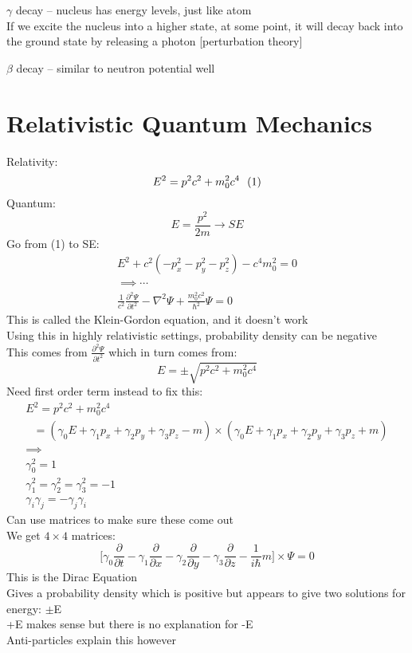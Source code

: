 \documentclass[a4paper, 11pt, fleqn, normalem]{report}
\begin{document}
$\gamma$ decay -- nucleus has energy levels, just like atom \\
If we excite the nucleus into a higher state, at some point, it will decay back into the ground state by releasing a photon [perturbation theory]

$\beta$ decay -- similar to neutron potential well

\section{Relativistic Quantum Mechanics}
Relativity:
\begin{equation*}
    E^{2} = p^{2}c^{2} + m_{0}^{2}c^{4} ~~ (1) \\
\end{equation*}
Quantum:
\begin{equation*}
    E = \frac{p^{2}}{2m} \rightarrow SE
\end{equation*}
Go from (1) to SE:
\begin{gather*}
    E^{2} + c^{2}(-p_{x}^{2} - p_{y}^{2} - p_{z}^{2}) - c^{4}m_{0}^{2} = 0 \\
    \implies \cdots \\
    \frac{1}{c^{2}}\frac{\partial^{2}\Psi}{\partial t^{2}} - \nabla^{2}\Psi + \frac{m_{0}^{2}c^{2}}{\hbar^{2}}\Psi = 0
\end{gather*}
This is called the Klein-Gordon equation, and it doesn't work \\
Using this in highly relativistic settings, probability density can be negative \\
This comes from $\frac{\partial^{2}\Psi}{\partial t^{2}}$ which in turn comes from:
\begin{equation*}
    E = \pm\sqrt{p^{2}c^{2} + m_{0}^{2}c^{4}}
\end{equation*}
Need first order term instead to fix this:
\begin{gather*}
    E^{2} = p^{2}c^{2} + m_{0}^{2}c^{4} \\
    ~~~ = (\gamma_{0}E + \gamma_{1}p_{x} + \gamma_{2}p_{y} + \gamma_{3}p_{z} - m) \times (\gamma_{0}E + \gamma_{1}p_{x} + \gamma_{2}p_{y} + \gamma_{3}p_{z} + m) \\
    \implies \\
    \gamma_{0}^{2} = 1 \\
    \gamma_{1}^{2} = \gamma_{2}^{2} = \gamma_{3}^{2} = -1 \\
    \gamma_{i}\gamma_{j} = -\gamma_{j}\gamma_{i}
\end{gather*}
Can use matrices to make sure these come out \\
We get $4 \times 4$ matrices:
\begin{equation*}
    \Bigg[\gamma_{0}\frac{\partial}{\partial t} - \gamma_{1}\frac{\partial}{\partial x} - \gamma_{2}\frac{\partial}{\partial y} - \gamma_{3}\frac{\partial}{\partial z} - \frac{1}{i\hbar}m\Bigg]\times\Psi = 0
\end{equation*}
This is the Dirac Equation \\
Gives a probability density which is positive but appears to give two solutions for energy: $\pm$E \\
+E makes sense but there is no explanation for -E \\
Anti-particles explain this however
\end{document}
